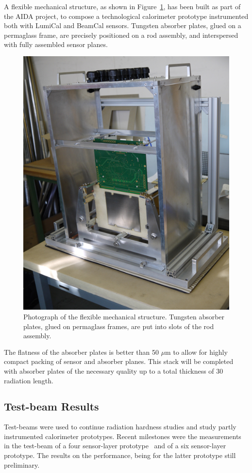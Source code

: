 A flexible mechanical structure, as shown in  Figure~\ref{fig:mechanical_structure}, has been 
built as part of the AIDA project,
to compose a technological 
calorimeter prototype instrumented both with LumiCal and BeamCal sensors. 
Tungsten absorber plates, glued on a permaglass
frame, are precisely
positioned on a rod assembly, and interspersed with fully assembled sensor planes.
\begin{figure}[hbp]
\centering
\includegraphics[width=0.6\columnwidth,]{Calorimeter/FCAL/figs/mechanical_structure_2}
\caption{Photograph of the flexible mechanical structure. Tungsten absorber plates, glued on permaglass frames, are put into slots of the
rod assembly.}
\label{fig:mechanical_structure}
\end{figure}
The flatness of the absorber plates is better than 50 {$\mu$m} to allow for highly compact 
packing of sensor and absorber planes. This stack will be completed 
with absorber plates of the necessary quality up to a total thickness of 30 radiation length. 

\subsection{Test-beam Results}

Test-beams were used to continue radiation hardness studies and study partly instrumented calorimeter prototypes.
Recent milestones were the measurements in the test-beam of a four
sensor-layer prototype~\cite{Abramowicz:2017cer} and of a six sensor-layer prototype. 
The results on the performance, being for the latter prototype still preliminary.   

